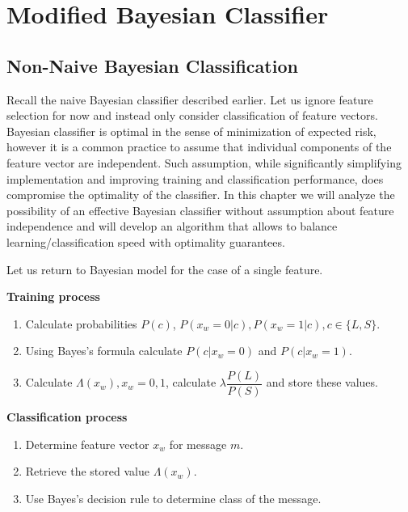 \documentclass[12pt]{report}
\makeatletter
\renewcommand{\subsection}{\@startsection{subsection}{2}{0mm}{-\baselineskip}{-5pt}{\bf}}
\makeatother
\begin{document}
\newpage


\chapter{Modified Bayesian Classifier}

\section{Non-Naive Bayesian Classification}

\subsection{Overview}

Recall the naive Bayesian classifier described earlier. Let us ignore feature selection for now and instead only consider classification of feature vectors. Bayesian classifier is optimal in the sense of minimization of expected risk, however it is a common practice to assume that individual components of the feature vector are independent. Such assumption, while significantly simplifying implementation and improving training and classification performance, does compromise the optimality of the classifier. In this chapter we will analyze the possibility of an effective Bayesian classifier without assumption about feature independence and will develop an algorithm that allows to balance learning/classification speed with optimality guarantees.

Let us return to Bayesian model for the case of a single feature.

\textbf{Training process}

\begin{enumerate}
	\item Calculate probabilities $P(c)$, $P(x_w = 0 | c), P(x_w = 1 | c), c \in \{L, S\}$.
	\item Using Bayes's formula calculate $P(c | x_w = 0)$ and $P(c | x_w = 1)$.
	\item Calculate $\Lambda(x_w), x_w = 0, 1$, calculate $\lambda \dfrac{P(L)}{P(S)}$ and store these values.
\end{enumerate}

\textbf{Classification process}

\begin{enumerate}
	\item Determine feature vector $x_w$ for message $m$.
	\item Retrieve the stored value $\Lambda(x_w)$.
	\item Use Bayes's decision rule to determine class of the message.
\end{enumerate}
\end{document}
